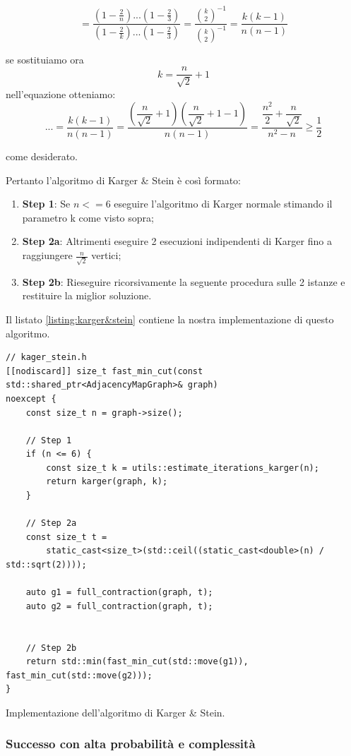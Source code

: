 $$ = \dfrac{(1 - \frac{2}{n}) ... (1 - \frac{2}{3})}{(1 - \frac{2}{k}) ... (1 - \frac{2}{3})} = \dfrac{{k\choose 2}^{-1}} {{k\choose 2}^{-1}} = \dfrac{k(k-1)}{n(n-1)}$$

\noindent se sostituiamo ora $$ k = \dfrac{n}{\sqrt{2}} + 1$$ nell'equazione otteniamo:
$$ ... = \dfrac{k(k-1)}{n(n-1)} = \dfrac{\left( \dfrac{n}{\sqrt{2}} + 1 \right) \left( \dfrac{n}{\sqrt{2}} + 1 - 1 \right) }{n(n-1)} =  \dfrac{\dfrac{n^2}{2} + \dfrac{n}{\sqrt{2}}}{n^2 - n}  \geq \dfrac{1}{2}$$

\noindent come desiderato. \newpage

\noindent Pertanto l'algoritmo di Karger \& Stein è così formato:
\begin{enumerate}
    \item \textbf{Step 1}: Se $n <= 6$ eseguire l'algoritmo di Karger normale stimando il parametro k come visto sopra;
    \item \textbf{Step 2a}: Altrimenti eseguire 2 esecuzioni indipendenti di Karger fino a raggiungere $\frac{n}{\sqrt{2}}$ vertici;
    \item \textbf{Step 2b}: Rieseguire ricorsivamente la seguente procedura sulle 2 istanze e restituire la miglior soluzione.
\end{enumerate}

Il listato \ref{listing:karger&stein} contiene la nostra implementazione di questo algoritmo.


\begin{listing}[!ht]
\begin{verbatim}
// kager_stein.h
[[nodiscard]] size_t fast_min_cut(const std::shared_ptr<AdjacencyMapGraph>& graph)
noexcept {
    const size_t n = graph->size();

    // Step 1
    if (n <= 6) {
        const size_t k = utils::estimate_iterations_karger(n);
        return karger(graph, k);
    }

    // Step 2a
    const size_t t =
        static_cast<size_t>(std::ceil((static_cast<double>(n) / std::sqrt(2))));

    auto g1 = full_contraction(graph, t);
    auto g2 = full_contraction(graph, t);


    // Step 2b
    return std::min(fast_min_cut(std::move(g1)), fast_min_cut(std::move(g2)));
}
\end{verbatim}
\caption{Implementazione dell'algoritmo di Karger \& Stein.}
\label{listing:karger&stein}
\end{listing}


\subsubsection{Successo con alta probabilità e complessità}
\label{sub:karger-stein-success-whp}

